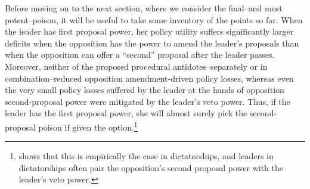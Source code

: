 \documentclass[12pt]{article}
\theoremstyle{plain}		      \newtheorem{assn}{Assumption}
\theoremstyle{plain}		      \newtheorem{prop}{Proposition}
\theoremstyle{plain}		      \newtheorem{lemma}{Lemma}
\theoremstyle{plain}	          \newtheorem{imp}{Implication}
\theoremstyle{plain}	          \newtheorem{hyp}{Hypothesis}
\theoremstyle{definition}		  \newtheorem{defn}{Definition}
\theoremstyle{remark}	          \newtheorem{rem}{Remark}
\theoremstyle{definition}         \newtheorem{case}{Case}
\begin{document}
\indent Before moving on to the next section, where we consider the final--and most potent--poison, it will be useful to take some inventory of the points so far. When the leader has first proposal power, her policy utility suffers significantly larger deficits when the opposition has the power to amend the leader's proposals than when the opposition can offer a ``second'' proposal after the leader passes. Moreover, neither of the proposed procedural antidotes--separately or in combination--reduced opposition amendment-driven policy losses, whereas even the very small policy losses suffered by the leader at the hands of opposition second-proposal power were mitigated by the leader's veto power. Thus, if the leader has the first proposal power, she will almost surely pick the second-proposal poison if given the option.\footnote{\citet{woodissert} shows that this is empirically the case in dictatorships, and leaders in dictatorships often pair the opposition's second proposal power with the leader's veto power.}
\end{document}
